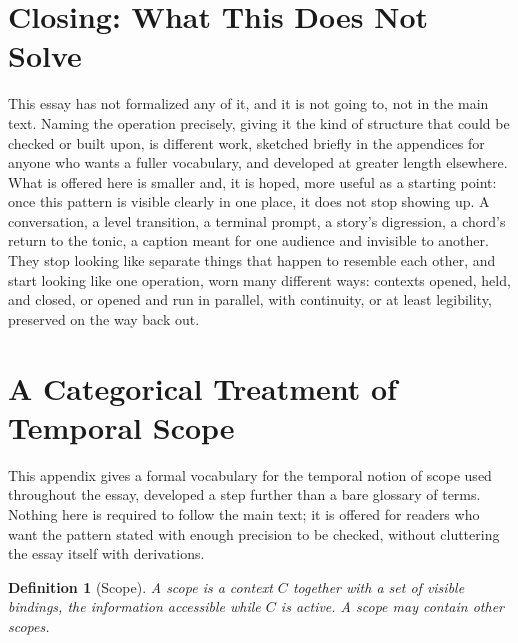 \documentclass[11pt]{article}
\newtheorem{definition}{Definition}
\begin{document}
\section{Closing: What This Does Not Solve}

This essay has not formalized any of it, and it is not going to, not in the main text. Naming the operation precisely, giving it the kind of structure that could be checked or built upon, is different work, sketched briefly in the appendices for anyone who wants a fuller vocabulary, and developed at greater length elsewhere. What is offered here is smaller and, it is hoped, more useful as a starting point: once this pattern is visible clearly in one place, it does not stop showing up. A conversation, a level transition, a terminal prompt, a story's digression, a chord's return to the tonic, a caption meant for one audience and invisible to another. They stop looking like separate things that happen to resemble each other, and start looking like one operation, worn many different ways: contexts opened, held, and closed, or opened and run in parallel, with continuity, or at least legibility, preserved on the way back out.

\appendix

\section{A Categorical Treatment of Temporal Scope}

This appendix gives a formal vocabulary for the temporal notion of scope used throughout the essay, developed a step further than a bare glossary of terms. Nothing here is required to follow the main text; it is offered for readers who want the pattern stated with enough precision to be checked, without cluttering the essay itself with derivations.

\begin{definition}[Scope]
A \emph{scope} is a context $C$ together with a set of visible bindings, the information accessible while $C$ is active. A scope may contain other scopes.
\end{definition}
\end{document}
